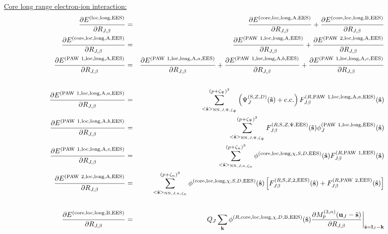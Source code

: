 \documentclass[paper=a4, fontsize=11pt]{article} %
\numberwithin{equation}{section} %
\numberwithin{figure}{section} %
\numberwithin{table}{section} %
\newcommand{\p}{\partial}
\newcommand{\bu}{{\bf{u}}}
\newcommand{\bl}{{\bf{l}}}
\newcommand{\bk}{{\bf{k}}}
\newcommand{\bs}{{\bf{s}}}
\newcommand{\hs}{{\hat{\bf{s}}}}
\newcommand{\rS}{{\mathrm{S}}}
\newcommand{\rEES}{{\mathrm{EES}}}
\newcommand{\rcore}{{\mathrm{core}}}
\newcommand{\rNN}{{\mathrm{NN}}}
\newcommand{\rcc}{{\mathrm{c.c.}}}
\newcommand{\rlong}{{\mathrm{long}}}
\newcommand{\rP}{{\mathrm{PAW}}}
\newcommand{\rA}{{\mathrm{A}}}
\newcommand{\rB}{{\mathrm{B}}}
\newcommand{\rlo}{{\mathrm{loc}}}
\newcommand{\RJb}{{R_{J,\beta}}}
\newcommand{\Mn}{{M_p^{(3,n)}}}
\newcommand{\pzp}{{(p+\zeta_{\Psi})^3}}
\newcommand{\pzn}{{(p+\zeta_n)^3}}
\newcommand{\hsJp}{{<\hs>_{\rNN,J,\Psi,\zeta_\Psi}}}
\newcommand{\hsJn}{{<\hs>_{\rNN,J,n,\zeta_n}}}
\begin{document}
\underline{Core long range electron-ion interaction:}
\begin{eqnarray}
\frac{\p E^{(\rlo,\rlong,\rEES)}}{\p \RJb}
&=& \frac{\p E^{(\rcore,\rlo,\rlong,\rA,\rEES)}}{\p \RJb}+\frac{\p E^{(\rcore,\rlo,\rlong,\rB,\rEES)}}{\p \RJb}\\
 \frac{\p E^{(\rcore,\rlo,\rlong,\rA,\rEES)}}{\p \RJb}
 &=&  \frac{\p E^{(\rP\ 1,\rlo,\rlong,\rA,\rEES)}}{\p \RJb} +  \frac{\p E^{(\rP\ 2,\rlo,\rlong,\rA,\rEES)}}{\p \RJb}\\
\frac{\p E^{(\rP\ 1,\rlo,\rlong,\rA,\rEES)}}{\p \RJb}
&=& \frac{\p E^{(\rP\ 1,\rlo,\rlong,\rA,a,\rEES)}}{\p \RJb}
+ \frac{\p E^{(\rP\ 1,\rlo,\rlong,\rA,b,\rEES)}}{\p \RJb} + \frac{\p E^{(\rP\ 1,\rlo,\rlong,\rA,c,\rEES)}}{\p \RJb}\nonumber \\ \\
\label{gr:dEloclong1AadR}
\frac{\p E^{(\rP\ 1,\rlo,\rlong,\rA,a,\rEES)}}{\p \RJb}
&=&\sum_{\hsJp}^{\pzp} \left(\Psi_J^{(\rS,Z,D)}(\hat \bs)+ \rcc\right) F_{J\beta}^{(R,\rP\ 1,\rlo,\rlong,\rA,a,\rEES)}(\hs) \\
\label{gr:dEloclong1AbdR}
\frac{\p E^{(\rP\ 1,\rlo,\rlong,\rA,b,\rEES)}}{\p \RJb}
&=& \sum_{\hsJp}^{\pzp} F_{J\beta}^{(R,\rS,Z,\Psi,\rEES)}(\hs) \phi_J^{(\rP\ 1,\rlo,\rlong,\rEES)}(\hs)\\
\label{gr:dEloclong1AcdR}
\frac{\p E^{(\rP\ 1,\rlo,\rlong,\rA,c,\rEES)}}{\p \RJb}
&=& \sum_{\hsJn}^{\pzn} \phi^{(\rcore,\rlo,\rlong,\chi,S,D,\rEES)}(\hs)  F_{J\beta}^{(R,\rP\ 1,\rEES)}(\hs) \\
\label{gr:dEloclong2AdR}
\frac{\p E^{(\rP\ 2,\rlo,\rlong,\rA,\rEES)}}{\p \RJb}
&=& \sum_{\hsJn}^{\pzn} \phi^{(\rcore,\rlo,\rlong,\chi,S,D,\rEES)}(\hs)  \left[F_{J\beta}^{(R,\rS,Z,2,\rEES)}(\hs)+ F_{J\beta}^{(R,\rP\ 2,\rEES)}(\hs)\right] \nonumber \\ \\
\label{gr:dEloclongBdR}
\frac{\p E^{(\rcore,\rlo,\rlong,\rB,\rEES)}}{\p \RJb}
&=& Q_J \sum_{\bk} \phi^{(R,\rcore,\rlo,\rlong,\chi,D,\rB,\rEES)}(\hs) \frac{\p \Mn (\bu_{J}-\hat \bs)}{\p \RJb} \bigg|_{\hs = \bl_J-\bk}
\end{eqnarray}
\end{document}
